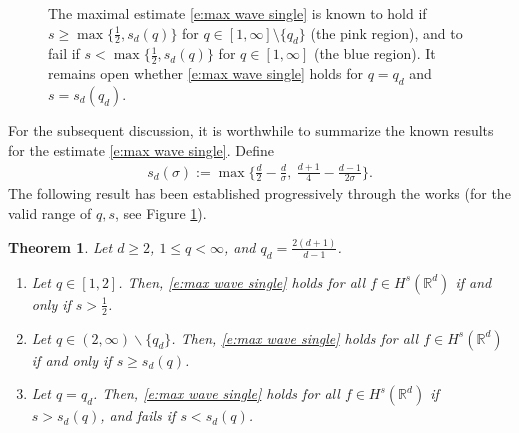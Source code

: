 \documentclass[a4paper]{amsart}
\numberwithin{figure}{section}
\numberwithin{equation}{section}%
\theoremstyle{plain}%
\newtheorem{theorem}{Theorem}[section]
\theoremstyle{definition}
\theoremstyle{remark}%
\newcommand{\R}{{\mathbb R}}
\begin{document}
\begin{figure}
\begin{tikzpicture}[scale=4]





\end{tikzpicture}
\caption{The maximal estimate \eqref{e:max wave single} is known to hold if $s\ge\max\{\frac12,s_d(q)\}$ for $q\in [1,\infty]\setminus\{q_d\}$ (the pink region), and to fail if $s<\max\{\frac12,s_d(q)\}$ for $q\in [1,\infty]$ (the blue region). It remains open whether \eqref{e:max wave single} holds for $q=q_d$ and $s=s_d(q_d)$.}
\label{FFF}
\end{figure}

For the subsequent discussion, it is  worthwhile to summarize the known results for the estimate \eqref{e:max wave single}. Define 
\begin{align}\label{sd_sigma}
s_d(\sigma)
:=
\max\Big\{\frac d2-\frac d\sigma, ~\frac{d+1}4-\frac{d-1}{2\sigma}\Big\}.
\end{align}
The following result has been established progressively through the works \cite{Cowling, Walther, RV08, CLL25} (for the valid range of $q,s$, see Figure \ref{FFF}).

\begin{theorem}\label{t:RV}
Let $d\ge2$, $1\le q <\infty$, and $q_d=\frac{2(d+1)}{d-1}$.
    \begin{enumerate}[$(i)$]   
        \item \label{item:max single q<2} Let $q\in[1,2]$. Then, \eqref{e:max wave single} holds for all $f\in H^s(\R^d)$ if and only if $s>\frac12$.
        \item \label{item:max single q>2} Let $q\in(2,\infty)\backslash\{q_d\}$. Then, \eqref{e:max wave single} holds for all $f\in H^s(\R^d)$ if and only if $s\geq s_d(q)$.
        \item \label{item:max single st} Let $q=q_d$. Then, \eqref{e:max wave single}  holds  for all $f\in H^s(\R^d)$ if $s>s_d(q)$, and fails if $s<s_d(q)$.
    \end{enumerate}
\end{theorem}
\end{document}
